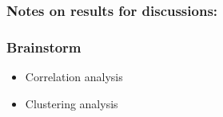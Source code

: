 \documentclass[manuscript,screen,review]{acmart}
\begin{document}
 



\subsubsection{Notes on results for discussions:}








\subsubsection{Brainstorm}
\begin{itemize}
    \item Correlation analysis
    \item Clustering analysis
\end{itemize}









\end{document}
